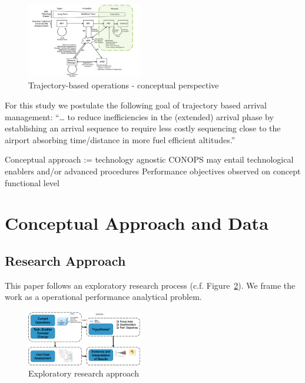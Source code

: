 \documentclass[letterpaper, 10 pt, journal, twoside]{IEEEtran}
\begin{document}
\begin{figure}

{\centering \includegraphics[width=0.45\textwidth,height=\textheight]{./figures/TBO-concept.png}

}

\caption{\label{fig-TBO-concept}Trajectory-based operations - conceptual
perspective}

\end{figure}

For this study we postulate the following goal of trajectory based
arrival management: ``\ldots{} to reduce inefficiencies in the
(extended) arrival phase by establishing an arrival sequence to require
less costly sequencing close to the airport absorbing time/distance in
more fuel efficient altitudes.''

Conceptual approach := technology agnostic CONOPS may entail
technological enablers and/or advanced procedures Performance objectives
observed on concept functional level

\hypertarget{conceptual-approach-and-data}{%
\section{Conceptual Approach and
Data}\label{conceptual-approach-and-data}}

\hypertarget{research-approach}{%
\subsection{Research Approach}\label{research-approach}}

This paper follows an exploratory research process (c.f.
Figure~\ref{fig-research-approach}). We frame the work as a operational
performance analytical problem.

\begin{figure}

{\centering \includegraphics[width=0.45\textwidth,height=\textheight]{./figures/exploratory-research-concept.png}

}

\caption{\label{fig-research-approach}Exploratory research approach}

\end{figure}
\end{document}
